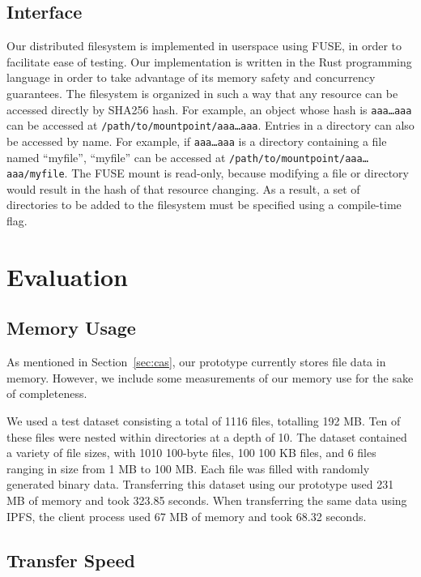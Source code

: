 \documentclass[twocolumn]{article}
\begin{document}
\subsection{Interface}

Our distributed filesystem is implemented in userspace using FUSE, in order to facilitate ease of testing.
Our implementation is written in the Rust programming language in order to take advantage of its memory safety and concurrency guarantees.
The filesystem is organized in such a way that any resource can be accessed directly by SHA256 hash.
For example, an object whose hash is \texttt{aaa\dots aaa} can be accessed at \texttt{/path/to/mountpoint/aaa\dots aaa}.
Entries in a directory can also be accessed by name.
For example, if \texttt{aaa\dots aaa} is a directory containing a file named ``myfile'', ``myfile'' can be accessed at \texttt{/path/to/mountpoint/aaa\dots aaa/myfile}.
The FUSE mount is read-only, because modifying a file or directory would result in the hash of that resource changing.
As a result, a set of directories to be added to the filesystem must be specified using a compile-time flag.

\section{Evaluation}

\subsection{Memory Usage}

As mentioned in Section~\ref{sec:cas}, our prototype currently stores file data in memory.
However, we include some measurements of our memory use for the sake of completeness.

We used a test dataset consisting a total of 1116 files, totalling 192 MB.\@
Ten of these files were nested within directories at a depth of 10.
The dataset contained a variety of file sizes, with 1010 100-byte files, 100 100 KB files, and 6 files ranging in size from 1 MB to 100 MB.
Each file was filled with randomly generated binary data.
Transferring this dataset using our prototype used 231 MB of memory and took 323.85 seconds.
When transferring the same data using IPFS, the client process used 67 MB of memory and took 68.32 seconds.

\subsection{Transfer Speed}
\end{document}
